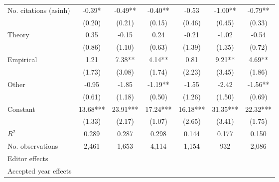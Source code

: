 \begin{table}
\begin{threeparttable}
\begin{tabular}{p{3.78cm}S@{}S@{}S@{}S@{}S@{}S@{}}
            No. citations (asinh)         &       -0.39*  &       -0.49** &       -0.40** &       -0.53   &       -1.00** &       -0.79** \\
                                          &      (0.20)   &      (0.21)   &      (0.15)   &      (0.46)   &      (0.45)   &      (0.33)   \\
            Theory                        &        0.35   &       -0.15   &        0.24   &       -0.21   &       -1.02   &       -0.54   \\
                                          &      (0.86)   &      (1.10)   &      (0.63)   &      (1.39)   &      (1.35)   &      (0.72)   \\
            Empirical                     &        1.21   &        7.38** &        4.14** &        0.81   &        9.21** &        4.69** \\
                                          &      (1.73)   &      (3.08)   &      (1.74)   &      (2.23)   &      (3.45)   &      (1.86)   \\
            Other                         &       -0.95   &       -1.85   &       -1.19** &       -1.55   &       -2.42   &       -1.56** \\
                                          &      (0.61)   &      (1.18)   &      (0.50)   &      (1.26)   &      (1.50)   &      (0.69)   \\
            Constant                      &       13.68***&       23.91***&       17.24***&       16.18***&       31.35***&       22.32***\\
                                          &      (1.33)   &      (2.17)   &      (1.07)   &      (2.65)   &      (3.41)   &      (1.75)   \\
            \midrule
            \(R^2\)                       &       0.289   &       0.287   &       0.298   &       0.144   &       0.177   &       0.150   \\
            No. observations              &       2,461   &       1,653   &       4,114   &       1,154   &         932   &       2,086   \\
            \midrule
            Editor effects       &           {}   &           {}   &           {}   &           {}   &           {}   &           {}   \\
            Accepted year effects         &           {}   &           {}   &               &           {}   &           {}   &               \\

\end{tabular}
\end{threeparttable}
\end{table}

